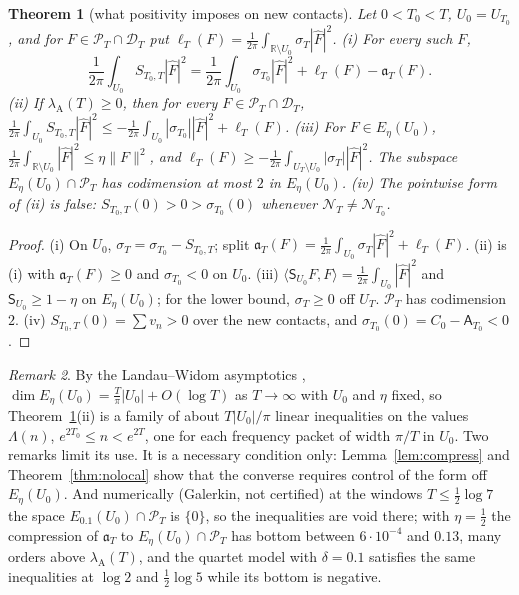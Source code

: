 \documentclass[11pt]{amsart}
\newtheorem{theorem}{Theorem}[section]
\theoremstyle{definition}
\theoremstyle{remark}
\newtheorem{remark}[theorem]{Remark}
\newcommand{\R}{\mathbb R}
\newcommand{\PT}{\mathcal P_T}
\newcommand{\lamA}{\lambda_{\mathrm A}(T)}
\newcommand{\sT}{\sigma_T}
\newcommand{\Fh}{\widehat F}
\begin{document}
\begin{theorem}[what positivity imposes on new contacts]\label{thm:X}
Let $0<T_0<T$, $U_0=U_{T_0}$, and for $F\in\PT\cap\mathcal D_T$ put $\ell_T(F)=\frac1{2\pi}\int_{\R\setminus U_0}\sT|\Fh|^2$.
\emph{(i)} For every such $F$,
\[
\frac1{2\pi}\int_{U_0}S_{T_0,T}|\Fh|^2=\frac1{2\pi}\int_{U_0}\sigma_{T_0}|\Fh|^2+\ell_T(F)-\mathfrak a_T(F).
\]
\emph{(ii)} If $\lamA\ge0$, then for every $F\in\PT\cap\mathcal D_T$,
$\frac1{2\pi}\int_{U_0}S_{T_0,T}|\Fh|^2\le-\frac1{2\pi}\int_{U_0}|\sigma_{T_0}||\Fh|^2+\ell_T(F)$.
\emph{(iii)} For $F\in E_\eta(U_0)$, $\frac1{2\pi}\int_{\R\setminus U_0}|\Fh|^2\le\eta\|F\|^2$, and
$\ell_T(F)\ge-\frac1{2\pi}\int_{U_T\setminus U_0}|\sT||\Fh|^2$. The subspace $E_\eta(U_0)\cap\PT$ has codimension at most
$2$ in $E_\eta(U_0)$.
\emph{(iv)} The pointwise form of (ii) is false: $S_{T_0,T}(0)>0>\sigma_{T_0}(0)$ whenever
$\mathcal N_T\ne\mathcal N_{T_0}$.
\end{theorem}
\begin{proof}
(i) On $U_0$, $\sT=\sigma_{T_0}-S_{T_0,T}$; split $\mathfrak a_T(F)=\frac1{2\pi}\int_{U_0}\sT|\Fh|^2+\ell_T(F)$. (ii) is
(i) with $\mathfrak a_T(F)\ge0$ and $\sigma_{T_0}<0$ on $U_0$. (iii) $\langle\mathsf S_{U_0}F,F\rangle=\frac1{2\pi}\int_{U_0}|\Fh|^2$
and $\mathsf S_{U_0}\ge1-\eta$ on $E_\eta(U_0)$; for the lower bound, $\sT\ge0$ off $U_T$. $\PT$ has codimension $2$.
(iv) $S_{T_0,T}(0)=\sum v_n>0$ over the new contacts, and $\sigma_{T_0}(0)=C_0-\mathsf A_{T_0}<0$.
\end{proof}

\begin{remark}\label{rem:X}
By the Landau--Widom asymptotics \cite{LandauWidom1980}, $\dim E_\eta(U_0)=\frac T\pi|U_0|+O(\log T)$ as $T\to\infty$
with $U_0$ and $\eta$ fixed, so Theorem~\ref{thm:X}(ii) is a family of about $T|U_0|/\pi$ linear inequalities on the
values $\Lambda(n)$, $e^{2T_0}\le n<e^{2T}$, one for each frequency packet of width $\pi/T$ in $U_0$. Two remarks limit
its use. It is a necessary condition only: Lemma~\ref{lem:compress} and Theorem~\ref{thm:nolocal} show that the
converse requires control of the form off $E_\eta(U_0)$. And numerically (Galerkin, not certified) at the windows
$T\le\frac12\log7$ the space $E_{0.1}(U_0)\cap\PT$ is $\{0\}$, so the inequalities are void there; with $\eta=\frac12$ the
compression of $\mathfrak a_T$ to $E_\eta(U_0)\cap\PT$ has bottom between $6\cdot10^{-4}$ and $0.13$, many orders above
$\lamA$, and the quartet model with $\delta=0.1$ satisfies the same inequalities at $\log2$ and $\frac12\log5$ while
its bottom is negative.
\end{remark}
\end{document}
